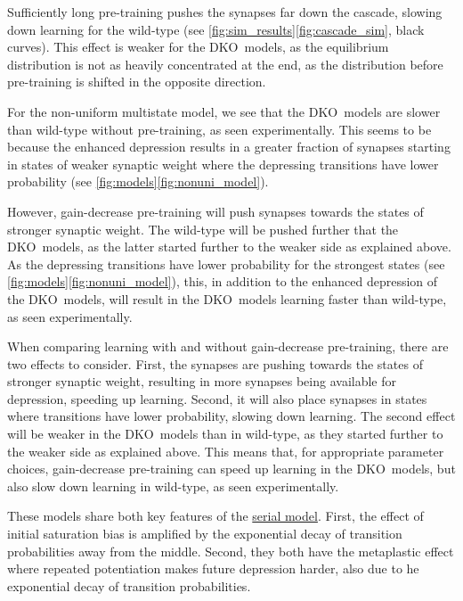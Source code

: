 \documentclass[10pt]{article}
\newcommand{\KO}{DKO}
\begin{document}
Sufficiently long pre-training pushes the synapses far down the cascade, slowing down learning for the wild-type (see \autoref{fig:sim_results}\ref{fig:cascade_sim}, black curves).
This effect is weaker for the \KO\ models, as the equilibrium distribution is not as heavily concentrated at the end, as the distribution before pre-training is shifted in the opposite direction.


For the non-uniform multistate model, we see that the \KO\ models are slower than wild-type without pre-training, as seen experimentally.
This seems to be because the enhanced depression results in a greater fraction of synapses starting in states of weaker synaptic weight %
where the depressing transitions have lower probability (see \autoref{fig:models}\ref{fig:nonuni_model}).

However, gain-decrease pre-training will push synapses towards the states of stronger synaptic weight.
The wild-type will be pushed further that the \KO\ models, as the latter started further to the weaker side as explained above. %
As the depressing transitions have lower probability for the strongest states (see \autoref{fig:models}\ref{fig:nonuni_model}), this, in addition to the enhanced depression of the \KO\ models, will result in the \KO\ models learning faster than wild-type, as seen experimentally.

When comparing learning with and without gain-decrease pre-training, there are two effects to consider.
First, the synapses are pushing towards the states of stronger synaptic weight, resulting in more synapses being available for depression, speeding up learning.
Second, it will also place synapses in states where transitions have lower probability, slowing down learning.
The second effect will be weaker in the \KO\ models than in wild-type, as they started further to the weaker side as explained above.
This means that, for appropriate parameter choices, gain-decrease pre-training can speed up learning in the \KO\ models, but also slow down learning in wild-type, as seen experimentally.

These models share both key features of the \hyperref[sec:multistate]{serial model}.
First, the effect of initial saturation bias is amplified by the exponential decay of transition probabilities away from the middle.
Second, they both have the metaplastic effect where repeated potentiation makes future depression harder, also due to he exponential decay of transition probabilities.
\end{document}
